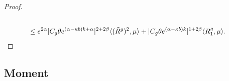 \documentclass[12pt, a4paper]{amsart}
\theoremstyle{definition}
\numberwithin{equation}{section}
\begin{document}
\begin{proof}
\begin{align*}
    \\&\leq e^{2\alpha}|C_g\theta e^{(\alpha-\kappa b)k+\alpha}|^{2+2\beta}\langle (\tilde R^g)^2,\mu\rangle + |C_g\theta e^{(\alpha-\kappa b)k}|^{1+2\beta}\langle R^g_1,\mu\rangle.
    \qedhere
\end{align*}
\end{proof}

\subsection{Moment}
\end{document}
